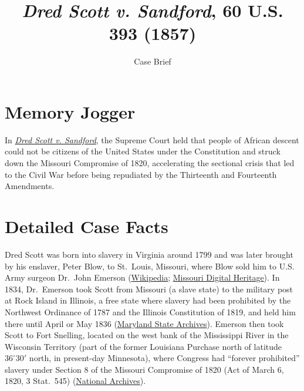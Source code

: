 \documentclass[12pt]{article}
\title{\textit{Dred Scott v. Sandford}, 60 U.S. 393 (1857)}
\subtitle{Case Brief}
\author{}
\date{}
\begin{document}
\maketitle

\section{Memory Jogger}

In \href{https://www.courtlistener.com/opinion/87116/dred-scott-v-sandford/}{\textit{Dred Scott v. Sandford}}, the Supreme Court held that people of African descent could not be citizens of the United States under the Constitution and struck down the Missouri Compromise of 1820, accelerating the sectional crisis that led to the Civil War before being repudiated by the Thirteenth and Fourteenth Amendments.

\section{Detailed Case Facts}

Dred Scott was born into slavery in Virginia around 1799 and was later brought by his enslaver, Peter Blow, to St.\ Louis, Missouri, where Blow sold him to U.S. Army surgeon Dr.\ John Emerson (\href{https://en.wikipedia.org/wiki/Dred_Scott_v._Sandford}{Wikipedia}; \href{https://www.sos.mo.gov/archives/resources/africanamerican/scott/scott.asp}{Missouri Digital Heritage}). In 1834, Dr.\ Emerson took Scott from Missouri (a slave state) to the military post at Rock Island in Illinois, a free state where slavery had been prohibited by the Northwest Ordinance of 1787 and the Illinois Constitution of 1819, and held him there until April or May 1836 (\href{https://msa.maryland.gov/megafile/msa/speccol/sc5300/sc5339/000091/000000/000004/restricted/dred_scott/decision/nelson.html}{Maryland State Archives}). Emerson then took Scott to Fort Snelling, located on the west bank of the Mississippi River in the Wisconsin Territory (part of the former Louisiana Purchase north of latitude $36^{\circ}30'$ north, in present-day Minnesota), where Congress had ``forever prohibited'' slavery under Section 8 of the Missouri Compromise of 1820 (Act of March 6, 1820, 3 Stat.\ 545) (\href{https://www.archives.gov/milestone-documents/dred-scott-v-sandford}{National Archives}).
\end{document}
